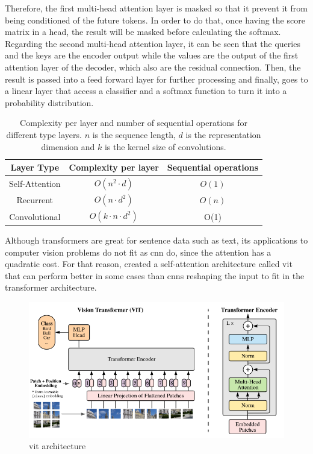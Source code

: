 \documentclass[11pt, a4paper]{article}
\begin{document}
	Therefore, the first multi-head attention layer is masked so that it prevent it from being conditioned of the future tokens. In order to do that, once having the score matrix in a head, the result will be masked before calculating the softmax. Regarding the second multi-head attention layer, it can be seen that the queries and the keys are the encoder output while the values are the output of the first attention layer of the decoder, which also are the residual connection. Then, the result is passed into a feed forward layer for further processing and finally, goes to a linear layer that access a classifier and a softmax function to turn it into a probability distribution.
	\begin{table}[H]
		\centering
		\caption{Complexity per layer and number of sequential operations for different type layers. $n$ is the sequence length, $d$ is the representation dimension and $k$ is the kernel size of convolutions.}
		\begin{tabular}{c|cc}
			Layer Type & Complexity per layer & Sequential operations\\\hline
			Self-Attention & $O(n^2 \cdot d)$ & $O(1)$\\
			Recurrent & $O(n \cdot d^2)$ & $O(n)$ \\
			Convolutional &  $O(k \cdot n \cdot d^2)$ & O(1)\\
		\end{tabular}
	\end{table}
	Although transformers are great for sentence data such as text, its applications to computer vision problems do not fit as \gls{cnn} do, since the attention has a quadratic cost. For that reason, \cite{vit} created a self-attention architecture called \gls{vit} that can perform better in some cases than \gls{cnn}s reshaping the input to fit in the transformer architecture.
	\begin{figure}[H]
		\centering
		\includegraphics[width=12cm]{imgs/relatedwork/vit-architecture}
		\caption{\gls{vit} architecture}
	\end{figure}
\end{document}
